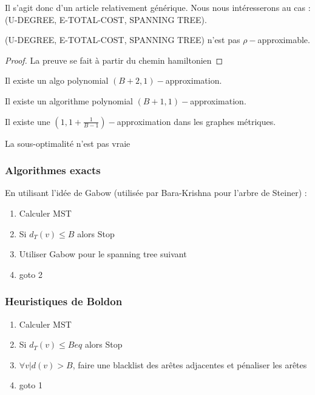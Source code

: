 \documentclass[a4paper,11pt]{thesis}
\begin{document}
Il s'agit donc d'un article relativement générique.
Nous nous intéresserons au cas : (U-DEGREE, E-TOTAL-COST, SPANNING TREE).
\begin{thrm}
    (U-DEGREE, E-TOTAL-COST, SPANNING TREE) n'est pas $\rho-$approximable.
\end{thrm}

\begin{proof}
    La preuve se fait à partir du chemin hamiltonien
\end{proof}

\begin{thrm}[Goemans]
    Il existe un algo polynomial $(B+2, 1)-$approximation.
\end{thrm}

\begin{thrm}
    Il existe un algorithme polynomial $(B+1, 1)-$approximation.
\end{thrm}

\begin{prop}
    Il existe une $(1, 1 + \frac{1}{B-1})-$approximation dans les graphes métriques.
\end{prop}

\begin{prop}
    La sous-optimalité n'est pas vraie
\end{prop}

\subsubsection{Algorithmes exacts}

En utilisant l'idée de Gabow (utilisée par Bara-Krishna pour l'arbre de Steiner) :
\begin{enumerate}
    \item Calculer MST
    \item Si $d_T(v) \leq B$ alors Stop
    \item Utiliser Gabow pour le spanning tree suivant
    \item goto 2
\end{enumerate}

\subsubsection{Heuristiques de Boldon}

\begin{enumerate}
    \item Calculer MST
    \item Si $d_T(v) \leq Beq$ alors Stop
    \item $\forall v | d(v) > B$, faire une blacklist des arêtes adjacentes et pénaliser les arêtes
    \item goto 1
\end{enumerate}
\end{document}
